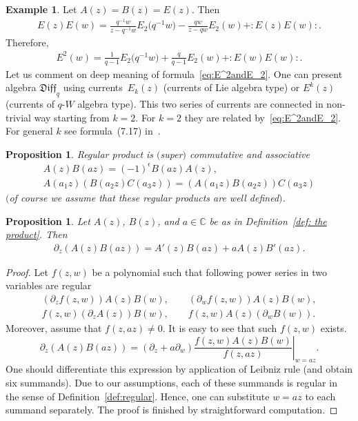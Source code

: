 \documentclass[pdftex]{sigma}
\numberwithin{equation}{section}
\newtheorem{Proposition}[Theorem]{Proposition}
\theoremstyle{definition}
\newtheorem{Example}[Theorem]{Example}
\newcommand{\qD}{\mathfrak{Diff}_q}
\begin{document}
\begin{Example}
Let $A(z)=B(z)=E(z)$. Then
\begin{gather*}
E(z) E(w) = \frac{q^{-1}w}{z-q^{-1}w} E_{2}\big(q^{-1}w\big) - \frac{q w }{z-q w} E_{2}(w) + :E(z) E(w):.
\end{gather*}
Therefore,
\begin{gather}
E^2 (w)= \frac{1}{q-1} E_{2}\big(q^{-1}w\big) + \frac{q}{q-1 } E_{2}(w) + :E(w) E(w):. \label{eq:E^2andE_2}
\end{gather}
Let us comment on deep meaning of formula~\eqref{eq:E^2andE_2}. One can present algebra $\qD$ using cur\-rents~$E_k(z)$ (currents of Lie algebra type) or $E^k(z)$ (currents of $q$-$W$ algebra type). This two series of currents are connected in non-trivial way starting from $k=2$. For $k=2$ they are related by~\eqref{eq:E^2andE_2}. For general $k$ see formula~(7.17) in~\cite{N16}.
\end{Example}

\begin{Proposition} \label{prop:ass&comm}
Regular product is $($super$)$ commutative and associative
\begin{gather*}
A(z)B(az)= (-1)^{\epsilon} B(az) A(z),\\
A(a_1z) ( B(a_2z) C(a_3z) ) = ( A(a_1z) B(a_2z) ) C(a_3z)
\end{gather*}
$($of course we assume that these regular products are well defined$)$.
\end{Proposition}

\begin{Proposition} \label{prop:deriv}
Let $A(z)$, $B(z)$, and $a\in \mathbb{C}$ be as in Definition~{\rm \ref{def: the product}}. Then
\begin{gather*}
\partial_z ( A(z) B(az) )= A'(z) B(az) + aA(z) B'(az).
\end{gather*}
\end{Proposition}
\begin{proof}
Let $f(z,w)$ be a polynomial such that following power series in two variables are regular
\begin{gather*}
 ( \partial_z f(z,w) ) A(z) B(w), \qquad ( \partial_w f(z,w) ) A(z) B(w), \\ f(z,w) ( \partial_z A(z) ) B(w), \qquad f(z,w) A(z) ( \partial_w B(w) ).
\end{gather*}
Moreover, assume that $f(z, az) \neq 0$. It is easy to see that such $f(z,w)$ exists.
\[
\partial_z ( A(z) B(az) )= (\partial_{z} + a \partial_{w}) \left. \frac{f(z,w) A(z) B(w)}{f(z,az)} \right|_{w=az}.
\]
One should differentiate this expression by application of Leibniz rule (and obtain six summands). Due to our assumptions, each of these summands is regular in the sense of Definition~\ref{def:regular}. Hence, one can substitute $w=az$ to each summand separately. The proof is finished by straightforward computation.
\end{proof}
\end{document}
